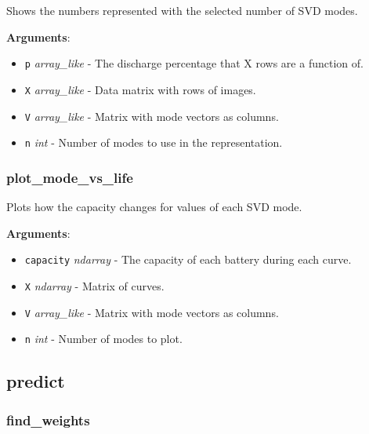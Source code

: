 Shows the numbers represented with the selected number of SVD modes.

\textbf{Arguments}:

\begin{itemize}
\tightlist
\item
  \texttt{p} \emph{array\_like} - The discharge percentage that X rows
  are a function of.
\item
  \texttt{X} \emph{array\_like} - Data matrix with rows of images.
\item
  \texttt{V} \emph{array\_like} - Matrix with mode vectors as columns.
\item
  \texttt{n} \emph{int} - Number of modes to use in the representation.
\end{itemize}

\subsubsection{plot\_mode\_vs\_life}

\begin{Shaded}
\begin{Highlighting}[]
\end{Highlighting}
\end{Shaded}

Plots how the capacity changes for values of each SVD mode.

\textbf{Arguments}:

\begin{itemize}
\tightlist
\item
  \texttt{capacity} \emph{ndarray} - The capacity of each battery during
  each curve.
\item
  \texttt{X} \emph{ndarray} - Matrix of curves.
\item
  \texttt{V} \emph{array\_like} - Matrix with mode vectors as columns.
\item
  \texttt{n} \emph{int} - Number of modes to plot.
\end{itemize}

\subsection{predict}

\subsubsection{find\_weights}

\begin{Shaded}
\begin{Highlighting}[]
\end{Highlighting}
\end{Shaded}

